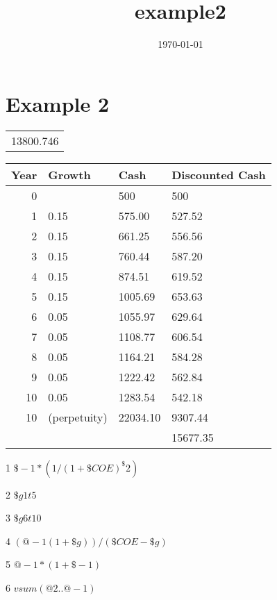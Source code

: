 \documentclass[11pt]{article}
\date{\today}
\title{example2}
\begin{document}
\maketitle
\tableofcontents

\section{Example 2}
\label{sec-1}

\begin{tabular}{r}
13800.746\\
\end{tabular}

\begin{table}
\centering
\begin{threeparttable}
\begin{tabular}{rlll}
Year & Growth & Cash & Discounted Cash\\
\hline
0 &  & 500 & 500\\
1 & 0.15\tnote{2} & 575.00\tnote{5} & 527.52\tnote{1}\\
2 & 0.15\tnote{2} & 661.25\tnote{5} & 556.56\tnote{1}\\
3 & 0.15\tnote{2} & 760.44\tnote{5} & 587.20\tnote{1}\\
4 & 0.15\tnote{2} & 874.51\tnote{5} & 619.52\tnote{1}\\
5 & 0.15\tnote{2} & 1005.69\tnote{5} & 653.63\tnote{1}\\
6 & 0.05\tnote{3} & 1055.97\tnote{5} & 629.64\tnote{1}\\
7 & 0.05\tnote{3} & 1108.77\tnote{5} & 606.54\tnote{1}\\
8 & 0.05\tnote{3} & 1164.21\tnote{5} & 584.28\tnote{1}\\
9 & 0.05\tnote{3} & 1222.42\tnote{5} & 562.84\tnote{1}\\
10 & 0.05\tnote{3} & 1283.54\tnote{5} & 542.18\tnote{1}\\
10 & (perpetuity) & 22034.10\tnote{4} & 9307.44\tnote{1}\\
 &  &  & 15677.35\\
\end{tabular}

\begin{tablenotes}
\item [1] \(\$-1*(1/(1+\$COE)^\$2)\)
\item [2] \(\$g1t5\)
\item [3] \(\$g6t10\)
\item [4] \((@-1(1+\$g))/(\$COE-\$g)\)
\item [5] \(@-1*(1+\$-1)\)
\item [6] \(vsum(@2..@-1)\)
\end{tablenotes}

\end{threeparttable}
\end{table}
\end{document}
